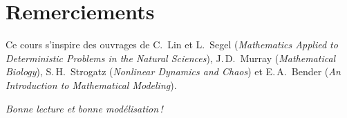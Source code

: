 \section*{Remerciements}

Ce cours s'inspire des ouvrages de C.~Lin et L.~Segel
(\textit{Mathematics Applied to Deterministic Problems in the Natural Sciences}),
J.\,D.~Murray (\textit{Mathematical Biology}),
S.\,H.~Strogatz (\textit{Nonlinear Dynamics and Chaos}) et
E.\,A.~Bender (\textit{An Introduction to Mathematical Modeling}).

\bigskip
\begin{flushright}
\textit{Bonne lecture et bonne mod\'elisation\,!}
\end{flushright}
